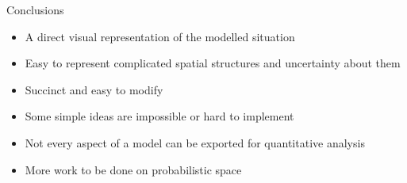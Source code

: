 \documentclass{beamer}
\newcommand\pro{\item[\textcolor{green}{$+$}]}
\newcommand\con{\item[\textcolor{red}{$-$}]}
\begin{document}

\begin{frame}{Conclusions}
  \begin{itemize}
    \pro A direct visual representation of the modelled situation
    \pro Easy to represent complicated spatial structures and uncertainty about
    them
    \pro Succinct and easy to modify
    \con Some simple ideas are impossible or hard to implement
    \con Not every aspect of a model can be exported for quantitative analysis
    \item More work to be done on probabilistic space
  \end{itemize}
\end{frame}
\end{document}
